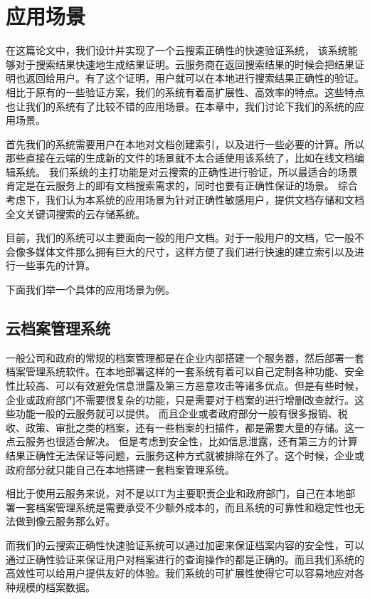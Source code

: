 \chapter{应用场景}
\label{chap:application}
在这篇论文中，我们设计并实现了一个云搜索正确性的快速验证系统，
该系统能够对于搜索结果快速地生成结果证明。云服务商在返回搜索结果的时候会把结果证明也返回给用户。有了这个证明，用户就可以在本地进行搜索结果正确性的验证。相比于原有的一些验证方案，我们的系统有着高扩展性、高效率的特点。这些特点也让我们的系统有了比较不错的应用场景。在本章中，我们讨论下我们的系统的应用场景。

首先我们的系统需要用户在本地对文档创建索引，以及进行一些必要的计算。所以那些直接在云端的生成新的文件的场景就不太合适使用该系统了，比如在线文档编辑系统。
我们系统的主打功能是对云搜索的正确性进行验证，所以最适合的场景肯定是在云服务上的即有文档搜索需求的，同时也要有正确性保证的场景。
综合考虑下，我们认为本系统的应用场景为针对正确性敏感用户，提供文档存储和文档全文关键词搜索的云存储系统。

目前，我们的系统可以主要面向一般的用户文档。对于一般用户的文档，它一般不会像多媒体文件那么拥有巨大的尺寸，这样方便了我们进行快速的建立索引以及进行一些事先的计算。

下面我们举一个具体的应用场景为例。

\section{云档案管理系统}
一般公司和政府的常规的档案管理都是在企业内部搭建一个服务器，然后部署一套档案管理系统软件。在本地部署这样的一套系统有着可以自己定制各种功能、安全性比较高、可以有效避免信息泄露及第三方恶意攻击等诸多优点。但是有些时候，企业或政府部门不需要很复杂的功能，只是需要对于档案的进行增删改查就行。这些功能一般的云服务就可以提供。
而且企业或者政府部分一般有很多报销、税收、政策、审批之类的档案，还有一些档案的扫描件，都是需要大量的存储。这一点云服务也很适合解决。
但是考虑到安全性，比如信息泄露，还有第三方的计算结果正确性无法保证等问题，云服务这种方式就被排除在外了。这个时候，企业或政府部分就只能自己在本地搭建一套档案管理系统。

相比于使用云服务来说，对不是以IT为主要职责企业和政府部门，自己在本地部署一套档案管理系统是需要承受不少额外成本的，而且系统的可靠性和稳定性也无法做到像云服务那么好。


而我们的云搜索正确性快速验证系统可以通过加密来保证档案内容的安全性，可以通过正确性验证来保证用户对档案进行的查询操作的都是正确的。而且我们系统的高效性可以给用户提供友好的体验。我们系统的可扩展性使得它可以容易地应对各种规模的档案数据。

